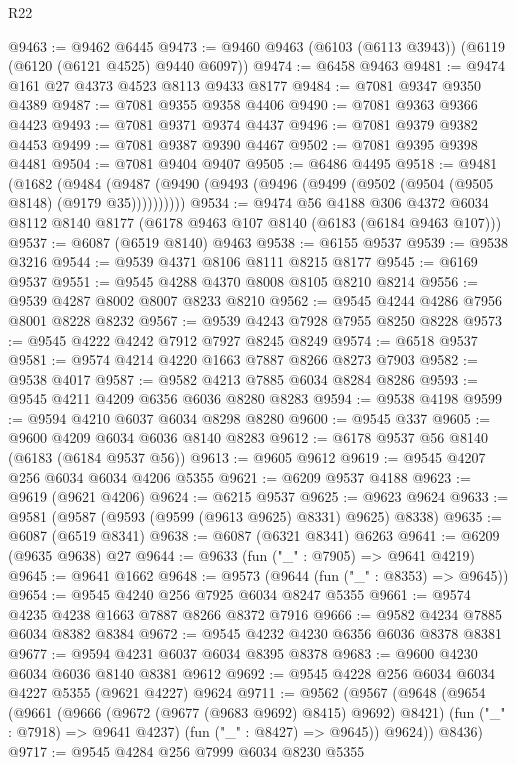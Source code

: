 \begin{lexlean}{R22}
\begin{coremodule}
@9463 := @9462 @6445
@9473 := @9460 @9463 (@6103 (@6113 @3943)) (@6119 (@6120 (@6121 @4525) @9440 @6097))
@9474 := @6458 @9463
@9481 := @9474 @161 @27 @4373 @4523 @8113 @9433 @8177
@9484 := @7081 @9347 @9350 @4389
@9487 := @7081 @9355 @9358 @4406
@9490 := @7081 @9363 @9366 @4423
@9493 := @7081 @9371 @9374 @4437
@9496 := @7081 @9379 @9382 @4453
@9499 := @7081 @9387 @9390 @4467
@9502 := @7081 @9395 @9398 @4481
@9504 := @7081 @9404 @9407
@9505 := @6486 @4495
@9518 := @9481
    (@1682
      (@9484 (@9487 (@9490 (@9493 (@9496 (@9499 (@9502 (@9504 (@9505 @8148) (@9179 @35))))))))))
@9534 := @9474
    @56
    @4188
    @306
    @4372
    @6034
    @8112
    @8140
    @8177
    (@6178 @9463 @107 @8140 (@6183 (@6184 @9463 @107)))
@9537 := @6087 (@6519 @8140) @9463
@9538 := @6155 @9537
@9539 := @9538 @3216
@9544 := @9539 @4371 @8106 @8111 @8215 @8177
@9545 := @6169 @9537
@9551 := @9545 @4288 @4370 @8008 @8105 @8210 @8214
@9556 := @9539 @4287 @8002 @8007 @8233 @8210
@9562 := @9545 @4244 @4286 @7956 @8001 @8228 @8232
@9567 := @9539 @4243 @7928 @7955 @8250 @8228
@9573 := @9545 @4222 @4242 @7912 @7927 @8245 @8249
@9574 := @6518 @9537
@9581 := @9574 @4214 @4220 @1663 @7887 @8266 @8273 @7903
@9582 := @9538 @4017
@9587 := @9582 @4213 @7885 @6034 @8284 @8286
@9593 := @9545 @4211 @4209 @6356 @6036 @8280 @8283
@9594 := @9538 @4198
@9599 := @9594 @4210 @6037 @6034 @8298 @8280
@9600 := @9545 @337
@9605 := @9600 @4209 @6034 @6036 @8140 @8283
@9612 := @6178 @9537 @56 @8140 (@6183 (@6184 @9537 @56))
@9613 := @9605 @9612
@9619 := @9545 @4207 @256 @6034 @6034 @4206 @5355
@9621 := @6209 @9537 @4188
@9623 := @9619 (@9621 @4206)
@9624 := @6215 @9537
@9625 := @9623 @9624
@9633 := @9581 (@9587 (@9593 (@9599 (@9613 @9625) @8331) @9625) @8338)
@9635 := @6087 (@6519 @8341)
@9638 := @6087 (@6321 @8341) @6263
@9641 := @6209 (@9635 @9638) @27
@9644 := @9633 (fun ("_" : @7905) => @9641 @4219)
@9645 := @9641 @1662
@9648 := @9573 (@9644 (fun ("_" : @8353) => @9645))
@9654 := @9545 @4240 @256 @7925 @6034 @8247 @5355
@9661 := @9574 @4235 @4238 @1663 @7887 @8266 @8372 @7916
@9666 := @9582 @4234 @7885 @6034 @8382 @8384
@9672 := @9545 @4232 @4230 @6356 @6036 @8378 @8381
@9677 := @9594 @4231 @6037 @6034 @8395 @8378
@9683 := @9600 @4230 @6034 @6036 @8140 @8381 @9612
@9692 := @9545 @4228 @256 @6034 @6034 @4227 @5355 (@9621 @4227) @9624
@9711 := @9562
    (@9567
      (@9648
        (@9654
          (@9661
            (@9666 (@9672 (@9677 (@9683 @9692) @8415) @9692) @8421)
            (fun ("_" : @7918) => @9641 @4237)
            (fun ("_" : @8427) => @9645))
          @9624))
      @8436)
@9717 := @9545 @4284 @256 @7999 @6034 @8230 @5355

\end{coremodule}
\end{lexlean}
